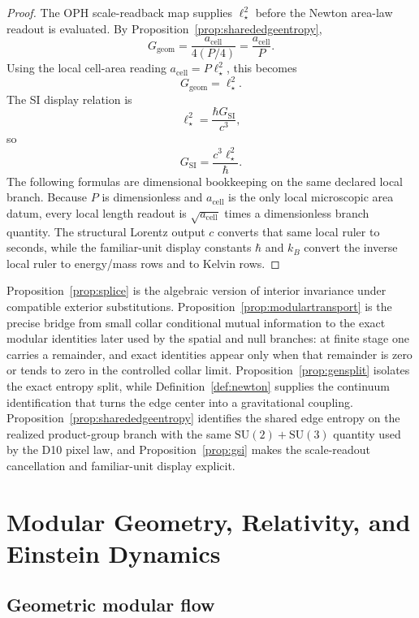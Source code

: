 \documentclass[11pt]{article}
\newcommand{\SU}{\mathrm{SU}}
\begin{document}
\begin{proof}
The OPH scale-readback map supplies \(\ell_\star^2\) before the Newton area-law readout is
evaluated. By Proposition~\ref{prop:sharededgeentropy},
\[
G_{\mathrm{geom}}
=
\frac{a_{\mathrm{cell}}}{4(P/4)}
=
\frac{a_{\mathrm{cell}}}{P}.
\]
Using the local cell-area reading \(a_{\mathrm{cell}}=P\ell_\star^2\), this becomes
\[
G_{\mathrm{geom}}=\ell_\star^2.
\]
The SI display relation is
\[
\ell_\star^2=\frac{\hbar G_{\mathrm{SI}}}{c^3},
\]
so
\[
G_{\mathrm{SI}}
=
\frac{c^3\ell_\star^2}{\hbar}.
\]
The following formulas are dimensional bookkeeping on the same declared local branch. Because \(P\)
is dimensionless and \(a_{\mathrm{cell}}\) is the only local microscopic area datum, every local
length readout is \(\sqrt{a_{\mathrm{cell}}}\) times a dimensionless branch quantity. The structural
Lorentz output \(c\) converts that same local ruler to seconds, while the familiar-unit display
constants \(\hbar\) and \(k_B\) convert the inverse local ruler to energy/mass rows and to Kelvin
rows. \qedhere
\end{proof}

Proposition~\ref{prop:splice} is the algebraic version of interior invariance under compatible exterior substitutions. Proposition~\ref{prop:modulartransport} is the precise bridge from small collar conditional mutual information to the exact modular identities later used by the spatial and null branches: at finite stage one carries a remainder, and exact identities appear only when that remainder is zero or tends to zero in the controlled collar limit. Proposition~\ref{prop:gensplit} isolates the exact entropy split, while Definition~\ref{def:newton} supplies the continuum identification that turns the edge center into a gravitational coupling.
Proposition~\ref{prop:sharededgeentropy} identifies the shared edge entropy on the realized product-group branch with the same \(\SU(2)+\SU(3)\) quantity used by the D10 pixel law, and Proposition~\ref{prop:gsi} makes the scale-readout cancellation and familiar-unit display explicit.

\section{Modular Geometry, Relativity, and Einstein Dynamics}\label{sec:gravity}

\subsection{Geometric modular flow}
\end{document}
